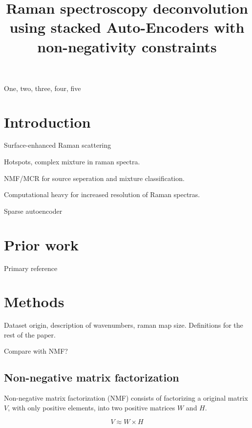 \documentclass{article}
\title{Raman spectroscopy deconvolution using stacked Auto-Encoders with non-negativity constraints}
\begin{document}
%

\maketitle
%
\begin{abstract}

\end{abstract}
%
\begin{keywords}
One, two, three, four, five
\end{keywords}
%
\section{Introduction}
\label{sec:intro}

Surface-enhanced Raman scattering

Hotspots, complex mixture in raman spectra. 

NMF/MCR for source seperation and mixture classification.

Computational heavy for increased resolution of Raman spectras.

Sparse autoencoder

\section{Prior work}
\label{sec:prior}



Primary reference \cite{Hosseini-Asl2016}

\section{Methods}
\label{sec:methods}

Dataset origin, description of wavenumbers, raman map size. Definitions for the rest of the paper.

Compare with NMF?

\subsection{Non-negative matrix factorization}

Non-negative matrix factorization (NMF) consists of factorizing a original matrix $V$, with only positive elements, into two positive matrices $W$ and $H$. \cite{Seung1999}


\begin{equation}
V \approx W \times H
\end{equation}
\end{document}
